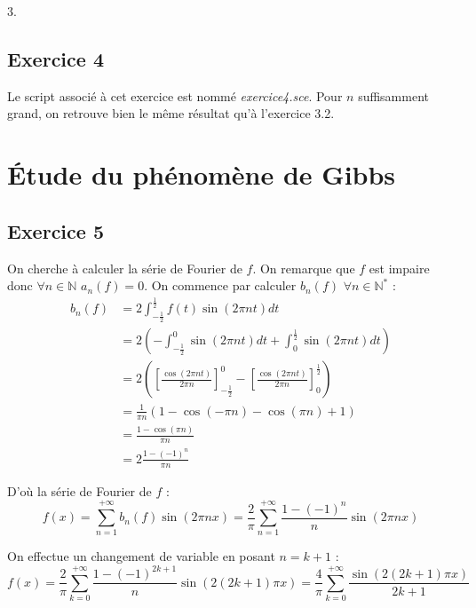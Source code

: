 \documentclass[a4paper,11pt]{article}
\begin{document}
	3. %

\subsection*{Exercice 4}
	Le script associé à cet exercice est nommé \textit{exercice4.sce}. Pour $n$ suffisamment grand, on retrouve bien le même résultat qu'à l'exercice 3.2.

\section{Étude du phénomène de Gibbs}

\subsection*{Exercice 5}
	On cherche à calculer la série de Fourier de $f$. On remarque que $f$ est impaire donc $\forall n \in \mathbb{N} $ $a_{n}(f) = 0$.
	On commence par calculer $b_{n}(f)$ $\forall n \in \mathbb{N}^{*}$ :
	\begin{align*}
		b_{n}(f)
		& = 2 \int_{-\frac{1}{2}}^{\frac{1}{2}} f(t) \sin (2 \pi n t) dt \\
		& = 2 \left ( - \int_{-\frac{1}{2}}^{0} \sin (2 \pi n t) dt + \int_{0}^{\frac{1}{2}} \sin (2 \pi n t) dt \right ) \\
		& = 2 \left ( \left [ \frac{\cos ( 2 \pi n t)}{2 \pi n} \right ]_{-\frac{1}{2}}^{0} - \left [ \frac{\cos ( 2 \pi n t)}{2 \pi n} \right ]_{0}^{\frac{1}{2}} \right ) \\
		& = \frac{1}{\pi n} \left ( 1 - \cos (- \pi n) - \cos ( \pi n) + 1 \right ) \\
		& = \frac{1 - \cos (\pi n)}{\pi n} \\
		& = 2 \frac{1-(-1)^{n}}{\pi n}
	\end{align*}

	D'où la série de Fourier de $f$ :
	\begin{equation*}
		f(x) = \sum_{n=1}^{+ \infty} b_{n}(f) \sin (2 \pi n x) = \frac{2}{\pi} \sum_{n=1}^{+ \infty} \frac{1-(-1)^{n}}{n} \sin (2 \pi n x)
	\end{equation*}

	On effectue un changement de variable en posant $n=k+1$ :
	\begin{equation*}
		f(x) =  \frac{2}{\pi} \sum_{k=0}^{+ \infty} \frac{1-(-1)^{2k+1}}{n} \sin (2 (2k+1) \pi x)
		= \frac{4}{\pi} \sum_{k=0}^{+ \infty} \frac{\sin (2 (2k+1) \pi x)}{2k+1}
	\end{equation*}
	
\end{document}
